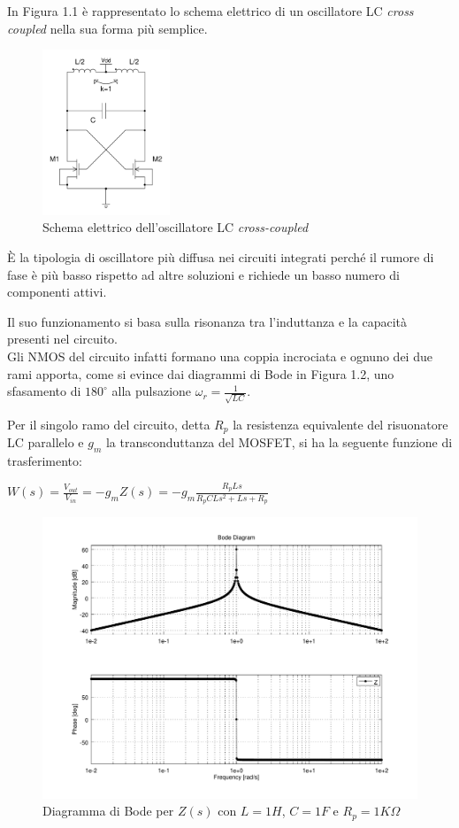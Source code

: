 \documentclass[a4paper, 12pt]{memoir}
\begin{document}
In Figura 1.1 è rappresentato lo schema elettrico di un oscillatore LC
\emph{cross coupled} nella sua forma più semplice.\\
\begin{figure}[h]
\centering
\includegraphics[width=0.34\textwidth]{images/LCosc.pdf}
\caption{Schema elettrico dell'oscillatore LC \emph{cross-coupled}}
\end{figure}
\`E la tipologia di oscillatore più diffusa nei circuiti integrati perché il
rumore di fase è più basso rispetto ad altre soluzioni e richiede un basso
numero di componenti attivi\cite{Amran05}\cite{RazaviRF}.

Il suo funzionamento si basa sulla risonanza tra l'induttanza e la capacità
presenti nel circuito. \\
Gli NMOS del circuito infatti formano una coppia incrociata e ognuno dei due
rami apporta, come si evince dai diagrammi di Bode in Figura 1.2, uno
sfasamento di $ 180^{\circ} $ alla pulsazione $ \omega _r=\frac{1}{\sqrt{LC}} $.

Per il singolo ramo del circuito, detta $ R_p $ la resistenza equivalente del
risuonatore LC parallelo e $ g_m $ la transconduttanza del MOSFET, si ha la
seguente funzione di trasferimento:
\begin{center}
$ W(s)=\frac{V_{out}}{V_{in}}=-g_m Z(s)=-g_m \frac{R_p L s}{R_p C L s^2 + Ls + R_p} $
\end{center}

\begin{figure}[h]
\centering
\includegraphics[width=\textwidth]{images/BodeLC.pdf}
\caption{Diagramma di Bode per $ Z(s) $ con $L=1H$, $C=1F$ e $R_p=1K\Omega$}
\end{figure}
\end{document}
